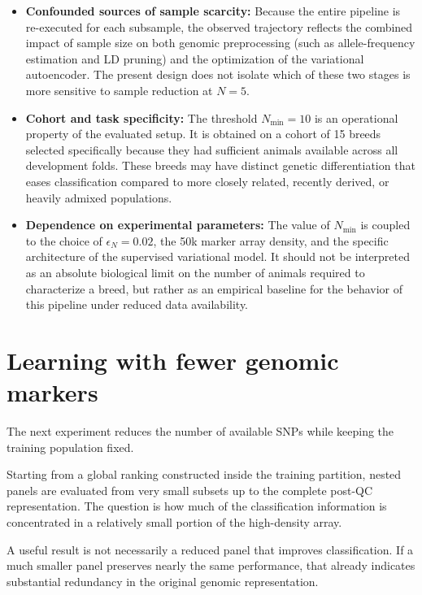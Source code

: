 \begin{itemize}
    \item \textbf{Confounded sources of sample scarcity:}
    Because the entire pipeline is re-executed for each subsample, the observed
    trajectory reflects the combined impact of sample size on both genomic
    preprocessing (such as allele-frequency estimation and LD pruning) and
    the optimization of the variational autoencoder. The present design does
    not isolate which of these two stages is more sensitive to sample reduction
    at $N=5$.

    \item \textbf{Cohort and task specificity:}
    The threshold $N_{\min} = 10$ is an operational property of the evaluated
    setup. It is obtained on a cohort of 15 breeds selected specifically
    because they had sufficient animals available across all development
    folds. These breeds may have distinct genetic differentiation that eases
    classification compared to more closely related, recently derived, or
    heavily admixed populations.

    \item \textbf{Dependence on experimental parameters:}
    The value of $N_{\min}$ is coupled to the choice of $\epsilon_N = 0.02$,
    the 50k marker array density, and the specific architecture of the
    supervised variational model. It should not be interpreted as an absolute
    biological limit on the number of animals required to characterize a
    breed, but rather as an empirical baseline for the behavior of this
    pipeline under reduced data availability.
\end{itemize}

\section{Learning with fewer genomic markers}
\label{sec:marker_efficiency_validation}

The next experiment reduces the number of available SNPs while keeping
the training population fixed.

Starting from a global ranking constructed inside the training
partition, nested panels are evaluated from very small subsets up to
the complete post-QC representation. The question is how much of the
classification information is concentrated in a relatively small
portion of the high-density array.

A useful result is not necessarily a reduced panel that improves
classification. If a much smaller panel preserves nearly the same
performance, that already indicates substantial redundancy in the
original genomic representation.

